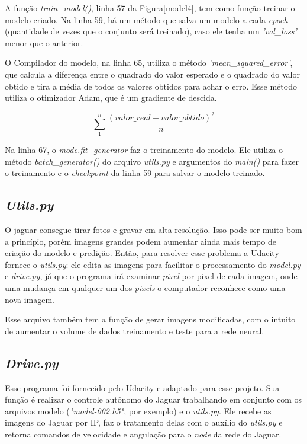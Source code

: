 A função \textit{train\_model()}, linha 57 da Figura\ref{model4}, tem como função treinar o modelo criado. Na linha 59, há um método que salva um modelo a cada \textit{epoch} (quantidade de vezes que o conjunto será treinado), caso ele tenha um \textit{'val\_loss'} menor que o anterior.

O Compilador do modelo, na linha 65, utiliza o método \textit{'mean\_squared\_error'}, que calcula a diferença entre o quadrado do valor esperado e o quadrado do valor obtido e tira a média de todos os valores obtidos para achar o erro. Esse método utiliza o otimizador Adam, que é um gradiente de descida.

\[\sum_{1}^{n}\frac{(valor\_real - valor\_obtido)^{2}}{n}\]

Na linha 67, o \textit{mode.fit\_generator} faz o treinamento do modelo. Ele utiliza o método \textit{batch\_generator()} do arquivo \textit{utils.py} e argumentos do \textit{main()} para fazer o treinamento e o \textit{checkpoint} da linha 59 para salvar o modelo treinado.


\subsection{\textit{Utils.py}}

 O jaguar consegue tirar fotos e gravar em alta resolução. Isso pode ser muito bom a princípio, porém imagens grandes podem aumentar ainda mais tempo de criação do modelo e predição. Então, para resolver esse problema a Udacity fornece o \textit{utils.py}: ele edita as imagens para facilitar o processamento do \textit{model.py} e \textit{drive.py}, já que o programa irá examinar \textit{pixel} por pixel de cada imagem, onde uma mudança em qualquer um dos \textit{pixels} o computador reconhece como uma nova imagem.

Esse arquivo também tem a função de gerar imagens modificadas, com o intuito de aumentar o volume de dados treinamento e teste para a rede neural.

\subsection{\textit{Drive.py}}
\label{sec:drive.py}

Esse programa foi fornecido pelo Udacity e adaptado para esse projeto. Sua função é realizar o controle autônomo do Jaguar trabalhando em conjunto com os arquivos modelo (\textit{"model-002.h5"}, por exemplo) e o \textit{utils.py}. Ele recebe as imagens do Jaguar por IP, faz o tratamento delas com o auxílio do \textit{utils.py} e retorna comandos de velocidade e angulação para o \textit{node} da rede do Jaguar. 


